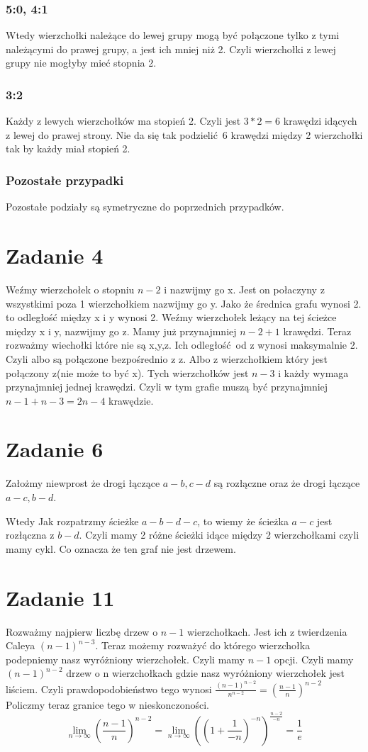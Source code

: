 \documentclass{article}
\begin{document}
\subsubsection*{5:0, 4:1}
Wtedy wierzchołki należące do lewej grupy mogą być połączone tylko z tymi należącymi do prawej grupy, a jest ich mniej niż 2. Czyli wierzchołki z lewej grupy nie mogłyby mieć stopnia 2.
\subsubsection*{3:2}
Każdy z lewych wierzchołków ma stopień 2. Czyli jest $3*2 = 6$ krawędzi idących z lewej do prawej strony. Nie da się tak podzielić 6 krawędzi między 2 wierzchołki tak by każdy miał stopień 2.
\subsubsection*{Pozostałe przypadki}
Pozostałe podziały są symetryczne do poprzednich przypadków.

\section*{Zadanie 4}
Weźmy wierzchołek o stopniu $n-2$ i nazwijmy go x. Jest on połaczyny z wszystkimi poza 1 wierzchołkiem nazwijmy go y. Jako że średnica grafu wynosi 2. to odległość między x i y wynosi 2. Weźmy wierzchołek leżący na tej ścieżce między x i y, nazwijmy go z. Mamy już przynajmniej $n-2 + 1$ krawędzi. Teraz rozważmy wiechołki które nie są x,y,z. Ich odległość od z wynosi maksymalnie 2. Czyli albo są połączone bezpośrednio z z. Albo z wierzchołkiem który jest połączony z(nie może to być x). Tych wierzchołków jest $n-3$ i każdy wymaga przynajmniej jednej krawędzi. Czyli w tym grafie muszą być przynajmniej $n-1 + n-3 = 2n-4$ krawędzie.

\section*{Zadanie 6}
Założmy niewprost że drogi łączące $a-b, c-d$ są rozłączne oraz że drogi łączące $a-c, b-d$. 

Wtedy Jak rozpatrzmy ścieżke $a-b-d-c$, to wiemy że ścieżka $a-c$ jest rozłączna z $b-d$. Czyli mamy 2 różne ścieżki idące między 2 wierzchołkami czyli mamy cykl. Co oznacza że ten graf nie jest drzewem.

\section*{Zadanie 11}
Rozważmy najpierw liczbę drzew o $n-1$ wierzchołkach. Jest ich z twierdzenia Caleya $(n-1)^{n-3}$. Teraz możemy rozważyć do którego wierzchołka podepniemy nasz wyróżniony wierzchołek. Czyli mamy $n-1$ opcji. Czyli mamy $(n-1)^{n-2}$ drzew o n wierzchołkach gdzie nasz wyróżniony wierzchołek jest liściem. Czyli prawdopodobieństwo tego wynosi
$\frac{(n-1)^{n-2}}{n^{n-2}} = (\frac{n-1}{n})^{n-2}$
Policzmy teraz granice tego w nieskonczoności.
\[
  \lim_{n \to \infty} (\frac{n-1}{n})^{n-2} = \lim_{n \to \infty} ((1 + \frac{1}{-n})^{-n})^{\frac{n-2}{-n}} = \frac{1}{e}
\]
\end{document}
